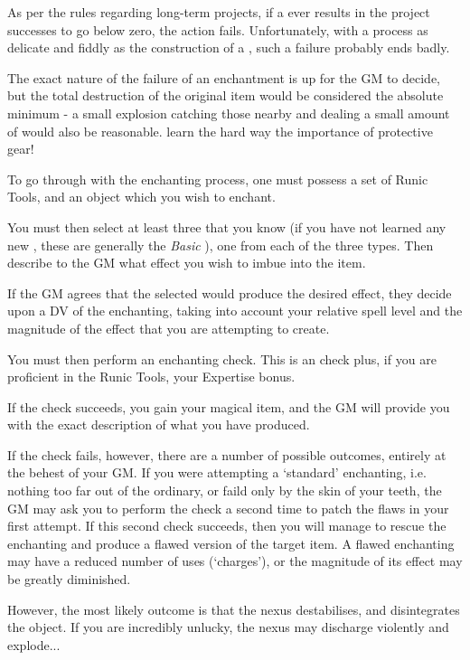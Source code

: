 As per the rules regarding long-term projects, if a  ever results in the project successes to go below zero, the action fails. Unfortunately, with a process as delicate and fiddly as the construction of a , such a failure probably ends badly. 

The exact nature of the failure of an enchantment is up for the GM to decide, but the total destruction of the original item would be considered the absolute minimum - a small explosion catching those nearby and dealing a small amount of  would also be reasonable.  learn the hard way the importance of protective gear!




To go through with the enchanting process, one must possess a set of Runic Tools, and an object which you wish to enchant. 

You must then select at least three  that you know (if you have not learned any new , these are generally the {\it Basic }), one from each of the three types. Then describe to the GM what effect you wish to imbue into the item. 

If the GM agrees that the selected  would produce the desired effect, they decide upon a DV of the enchanting, taking into account your relative spell level and the magnitude of the effect that you are attempting to create. 

You must then perform an enchanting check. This is an \attFin{} check plus, if you are proficient in the Runic Tools, your Expertise bonus. 

If the check succeeds, you gain your magical item, and the GM will provide you with the exact description of what you have produced. 

If the check fails, however, there are a number of possible outcomes, entirely at the behest of your GM. If you were attempting a `standard' enchanting, i.e. nothing too far out of the ordinary, or faild only by the skin of your teeth, the GM may ask you to perform the check a second time to patch the flaws in your first attempt. If this second check succeeds, then you will manage to rescue the enchanting and produce a flawed version of the target item. A flawed enchanting may have a reduced number of uses (`charges'), or the magnitude of its effect may be greatly diminished. 

However, the most likely outcome is that the nexus destabilises, and disintegrates the object. If you are incredibly unlucky, the nexus may discharge violently and explode...

